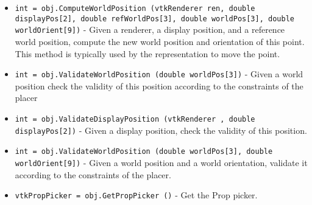 \begin{itemize}
\item  \verb|int = obj.ComputeWorldPosition (vtkRenderer ren, double displayPos[2], double refWorldPos[3], double worldPos[3], double worldOrient[9])| -  Given a renderer, a display position, and a reference world
 position, compute the new world position and orientation 
 of this point. This method is typically used by the 
 representation to move the point.

\item  \verb|int = obj.ValidateWorldPosition (double worldPos[3])| -  Given a world position check the validity of this 
 position according to the constraints of the placer

\item  \verb|int = obj.ValidateDisplayPosition (vtkRenderer , double displayPos[2])| -  Given a display position, check the validity of this position.

\item  \verb|int = obj.ValidateWorldPosition (double worldPos[3], double worldOrient[9])| -  Given a world position and a world orientation,
 validate it according to the constraints of the placer.

\item  \verb|vtkPropPicker = obj.GetPropPicker ()| -  Get the Prop picker.

\end{itemize}
